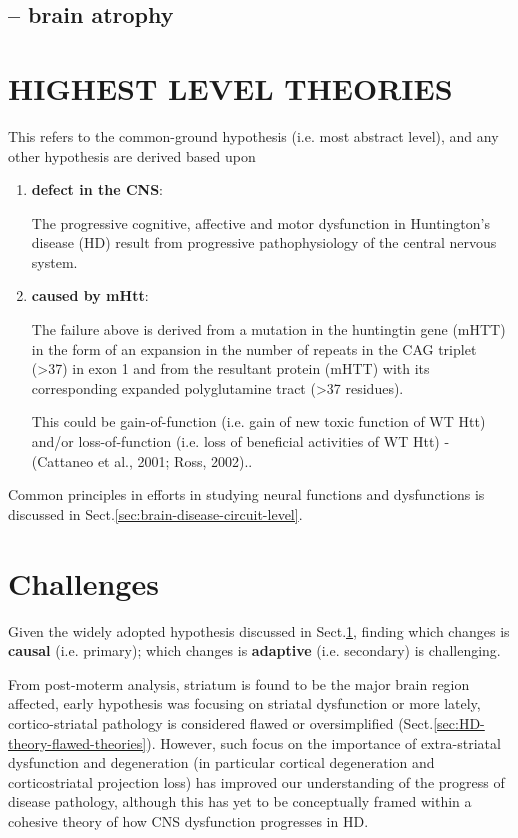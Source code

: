 \subsection{-- brain atrophy}




\section{HIGHEST LEVEL THEORIES}
\label{sec:HD-theory-common-ground}

This refers to the common-ground hypothesis (i.e. most abstract level), and any
other hypothesis are derived based upon
\begin{enumerate}
  \item {\bf defect in the CNS}: 
  
The progressive cognitive, affective and motor dysfunction in Huntington's
disease (HD) result from progressive pathophysiology of the central nervous
system.

  \item {\bf caused by mHtt}:
  
The failure above is derived from a mutation in the huntingtin gene (mHTT) in
the form of an expansion in the number of repeats in the CAG triplet (>37) in
exon 1 and from the resultant protein (mHTT) with its corresponding expanded
polyglutamine tract (>37 residues).

This could be gain-of-function (i.e. gain of new toxic function of WT Htt)
and/or loss-of-function (i.e. loss of beneficial activities of WT Htt) -
(Cattaneo et al., 2001; Ross, 2002)..


\end{enumerate}

Common principles in efforts in studying neural functions and dysfunctions is
discussed in Sect.\ref{sec:brain-disease-circuit-level}.

\section{Challenges}
\label{sec:HD-challenge}

Given the widely adopted hypothesis discussed in
Sect.\ref{sec:HD-theory-common-ground}, finding which changes is {\bf causal}
(i.e. primary); which changes is {\bf adaptive} (i.e. secondary) is challenging. 

From post-moterm analysis, striatum is found to be the major brain region
affected, early hypothesis was focusing on striatal dysfunction or more lately,
cortico-striatal pathology is considered flawed or oversimplified
(Sect.\ref{sec:HD-theory-flawed-theories}). However, such focus on the
importance of extra-striatal dysfunction and degeneration (in particular
cortical degeneration and corticostriatal projection loss) has improved our
understanding of the progress of disease pathology, although this has yet to be
conceptually framed within a cohesive theory of how CNS dysfunction progresses
in HD.

